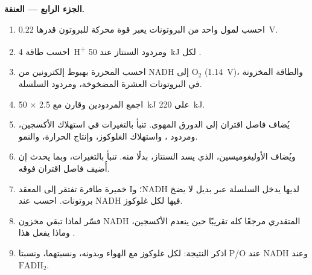\begin{problem}
\medskip
\noindent\textbf{الجزء الرابع --- العنفة.}
\begin{enumerate}[resume]
  \item احسب  لمول واحد من البروتونات يعبر قوة محركة
        للبروتون قدرها \qty{0.22}{V}.
  \item احسب طاقة \qty{4}{H^+} ومردود السنتاز عند \qty{50}{kJ} لكل
        .
  \item احسب  المحررة بهبوط إلكترونين من NADH إلى
        $\mathrm{O_2}$ (\qty{1.14}{V})، والطاقة المخزونة في
        البروتونات العشرة المضخوخة، ومردود السلسلة.
  \item اجمع المردودين وقارن مع 2.5  $\times$ \qty{50}{kJ} على
        \qty{220}{kJ}.
  \item يُضاف فاصل اقتران إلى الدورق المهوى. تنبأ بالتغيرات في
        استهلاك الأكسجين، ومردود ، واستهلاك الغلوكوز، وإنتاج
        الحرارة، والنمو.
  \item ويُضاف الأوليغوميسين، الذي يسد السنتاز، بدلًا منه. تنبأ
        بالتغيرات، وبما يحدث إن أُضيف فاصل اقتران فوقه.
  \item خميرة طافرة تفتقر إلى المعقد I؛ وNADH لديها يدخل السلسلة عبر
         بديل لا يضخ بروتونات. احسب  عند NADH فيها 
        لكل غلوكوز.
  \item فسّر لماذا تبقي  مخزون NADH المتقدري مرجعًا كله تقريبًا
        حين ينعدم الأكسجين، وماذا يفعل هذا .
  \item اذكر النتيجة:  لكل غلوكوز مع الهواء وبدونه، ونسبتهما،
        ونسبتا P/O عند NADH وعند $\mathrm{FADH_2}$.
\end{enumerate}
\end{problem}
